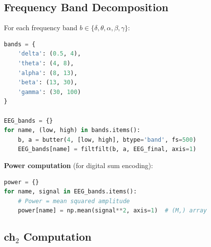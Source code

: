 \subsection{Frequency Band Decomposition}

\begin{algorithm}\label{alg:bands}
For each frequency band $b \in \{\delta, \theta, \alpha, \beta, \gamma\}$:

\begin{lstlisting}[language=Python]
bands = {
    'delta': (0.5, 4),
    'theta': (4, 8),
    'alpha': (8, 13),
    'beta': (13, 30),
    'gamma': (30, 100)
}

EEG_bands = {}
for name, (low, high) in bands.items():
    b, a = butter(4, [low, high], btype='band', fs=500)
    EEG_bands[name] = filtfilt(b, a, EEG_final, axis=1)
\end{lstlisting}

\textbf{Power computation} (for digital sum encoding):
\begin{lstlisting}[language=Python]
power = {}
for name, signal in EEG_bands.items():
    # Power = mean squared amplitude
    power[name] = np.mean(signal**2, axis=1)  # (M,) array
\end{lstlisting}
\end{algorithm}

\subsection{ch$_2$ Computation}


